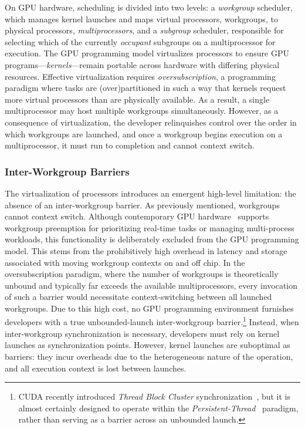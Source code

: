 \documentclass[sigconf]{acmart}
\begin{document}
On GPU hardware, scheduling is divided into two levels: a \emph{workgroup} scheduler, which manages kernel launches and maps virtual processors, workgroups, to physical processors, \emph{multiprocessors}, and a \emph{subgroup} scheduler, responsible for selecting which of the currently \emph{occupant} subgroups on a multiprocessor for execution. The GPU programming model virtualizes processors to ensure GPU programs---\emph{kernels}---remain portable across hardware with differing physical resources. Effective virtualization requires \emph{oversubscription}, a programming paradigm where tasks are (over)partitioned in such a way that kernels request more virtual processors than are physically available. As a result, a single multiprocessor may host multiple workgroups simultaneously. However, as a consequence of virtualization, the developer relinquishes control over the order in which workgroups are launched, and once a workgroup begins execution on a multiprocessor, it must run to completion and cannot context switch.

\subsubsection{Inter-Workgroup Barriers}
The virtualization of processors introduces an emergent high-level limitation: the absence of an inter-workgroup barrier. As previously mentioned, workgroups cannot context switch. Although contemporary GPU hardware~\cite{} supports workgroup preemption for prioritizing real-time tasks or managing multi-process workloads, this functionality is deliberately excluded from the GPU programming model. This stems from the prohibitively high overhead in latency and storage associated with moving workgroup contexts on and off chip. In the oversubscription paradigm, where the number of workgroups is theoretically unbound and typically far exceeds the available multiprocessors, every invocation of such a barrier would necessitate context-switching between all launched workgroups. Due to this high cost, no GPU programming environment furnishes developers with a true unbounded-launch inter-workgroup barrier.\footnote{CUDA recently introduced \emph{Thread Block Cluster} synchronization~\cite{NvidiaCudaGuide}, but it is almost certainly designed to operate within the \emph{Persistent-Thread}~\cite{gupta2012} paradigm, rather than serving as a barrier across an unbounded launch.} Instead, when inter-workgroup synchronization is necessary, developers must rely on kernel launches as synchronization points. However, kernel launches are suboptimal as barriers: they incur overheads due to the heterogeneous nature of the operation, and all execution context is lost between launches.
\end{document}
